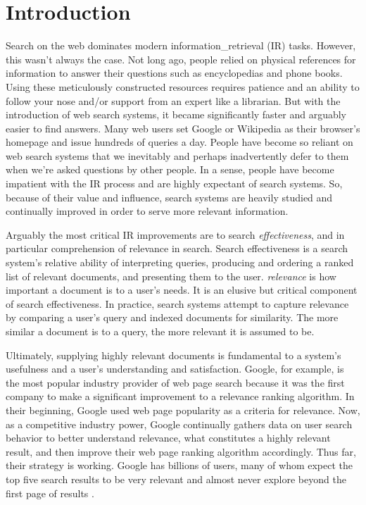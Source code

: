\chapter{Introduction} \label{ch:[chapter 1 label]}

Search on the web dominates modern \gls{information_retrieval} (\acrfull{IR}) tasks. However, this wasn't always the case. Not long ago, people relied on physical references for information to answer their questions such as encyclopedias and phone books. Using these meticulously constructed resources requires patience and an ability to follow your nose and/or support from an expert like a librarian. But with the introduction of web search systems, it became significantly faster and arguably easier to find answers. Many web users set Google or Wikipedia as their browser’s homepage and issue hundreds of queries a day. People have become so reliant on web search systems that we inevitably and perhaps inadvertently defer to them when we’re asked questions by other people. In a sense, people have become impatient with the IR process and are highly expectant of search systems. So, because of their value and influence, search systems are heavily studied and continually improved in order to serve more relevant information.

Arguably the most critical IR improvements are to search \emph{effectiveness}, and in particular comprehension of relevance in search. Search effectiveness is a search system’s relative ability of interpreting queries, producing and ordering a ranked list of relevant documents, and presenting them to the user. \emph{\gls{relevance}} is how important a document is to a user’s needs. It is an elusive but critical component of search effectiveness. In practice, search systems attempt to capture relevance by comparing a user’s query and indexed documents for similarity. The more similar a document is to a query, the more relevant it is assumed to be.

Ultimately, supplying highly relevant documents is fundamental to a system’s usefulness and a user’s understanding and satisfaction. Google, for example, is the most popular industry provider of web page search because it was the first company to make a significant improvement to a relevance ranking algorithm. In their beginning, Google used web page popularity as a criteria for relevance. Now, as a competitive industry power, Google continually gathers data on user search behavior to better understand relevance, what constitutes a highly relevant result, and then improve their web page ranking algorithm accordingly. Thus far, their strategy is working. Google has billions of users, many of whom expect the top five search results to be very relevant and almost never explore beyond the first page of results \cite{Manning2008}.


